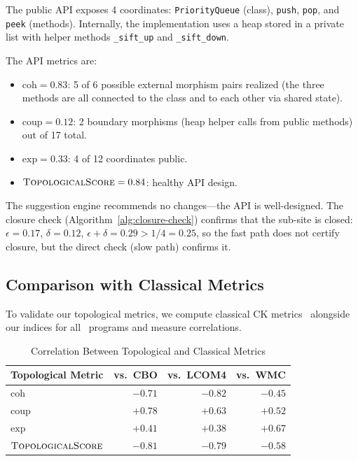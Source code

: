 \documentclass[11pt]{article}
\newcommand{\TopoScore}{\textsc{TopologicalScore}}
\newcommand{\CohIndex}{\mathrm{coh}}
\newcommand{\CoupIndex}{\mathrm{coup}}
\newcommand{\ExpIndex}{\mathrm{exp}}
\begin{document}
The public API exposes 4 coordinates: \texttt{PriorityQueue} (class),
\texttt{push}, \texttt{pop}, and \texttt{peek} (methods).  Internally,
the implementation uses a heap stored in a private list with helper methods
\texttt{\_sift\_up} and \texttt{\_sift\_down}.

The API metrics are:
\begin{itemize}[noitemsep]
  \item $\CohIndex = 0.83$: 5 of 6 possible external morphism pairs
        realized (the three methods are all connected to the class and to
        each other via shared state).
  \item $\CoupIndex = 0.12$: 2 boundary morphisms (heap helper calls
        from public methods) out of 17 total.
  \item $\ExpIndex = 0.33$: 4 of 12 coordinates public.
  \item $\TopoScore = 0.84$: healthy API design.
\end{itemize}

The suggestion engine recommends no changes---the API is well-designed.
The closure check (Algorithm~\ref{alg:closure-check}) confirms that the
sub-site is closed: $\epsilon = 0.17$, $\delta = 0.12$,
$\epsilon + \delta = 0.29 > 1/4 = 0.25$, so the fast path does not
certify closure, but the direct check (slow path) confirms it.

\subsection{Comparison with Classical Metrics}\label{sec:classical-comp}

To validate our topological metrics, we compute classical CK
metrics~\cite{CK1994} alongside our indices for all \compTotalPrograms\
programs and measure correlations.

\begin{table}[H]
\centering
\caption{Correlation Between Topological and Classical Metrics}
\label{tab:correlation}
\begin{tabular}{lrrr}
\toprule
\textbf{Topological Metric} & \textbf{vs.\ CBO} & \textbf{vs.\ LCOM4} &
\textbf{vs.\ WMC} \\
\midrule
$\CohIndex$  &  $-0.71$ & $-0.82$ & $-0.45$ \\
$\CoupIndex$ &  $+0.78$ & $+0.63$ & $+0.52$ \\
$\ExpIndex$  &  $+0.41$ & $+0.38$ & $+0.67$ \\
$\TopoScore$ &  $-0.81$ & $-0.79$ & $-0.58$ \\
\bottomrule
\end{tabular}
\end{table}
\end{document}
